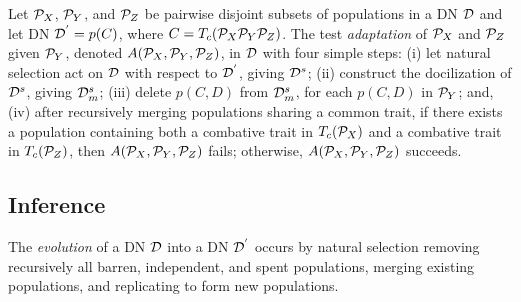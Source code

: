 Let ${\cal{P}}_X$, ${\cal{P}}_Y$, and ${\cal{P}}_Z$ be pairwise disjoint subsets of populations in a DN $\cal D$ and let DN ${\cal{D}}^{'} = {p(C)}$, where $C = T_c({\cal{P}}_X {\cal{P}}_Y {\cal{P}}_Z)$. 
The test \emph{adaptation} of ${\cal{P}}_X$ and ${\cal{P}}_Z$ given ${\cal{P}}_Y$, denoted $A({\cal{P}}_X,{\cal{P}}_Y,{\cal{P}}_Z)$, in $\cal D$ with four simple steps:
(i) let natural selection act on $\cal{D}$ with respect to ${\cal{D}}^{'}$, giving ${\cal{D}}^{s}$;
(ii) construct the docilization of ${\cal{D}}^{s}$, giving ${\cal{D}}^s_m$;
(iii) delete $p(C,D)$ from ${\cal{D}}^s_m$, for each $p(C,D)$ in ${\cal{P}}_Y$; and,
(iv) after recursively merging populations sharing a common trait, if there exists a population containing both a combative trait in $T_c({\cal{P}}_X)$ and a combative trait in $T_c({\cal{P}}_Z)$, then $A({\cal{P}}_X,{\cal{P}}_Y,{\cal{P}}_Z)$ fails; otherwise, $A({\cal{P}}_X,{\cal{P}}_Y,{\cal{P}}_Z)$ succeeds.


\subsection{Inference}
\label{subsec:evolution}


The \emph{evolution} of a DN $\cal{D}$ into a DN ${\cal{D}}^{'}$ occurs by natural selection removing recursively all barren, independent, and spent populations, merging existing populations, and replicating to form new populations.


